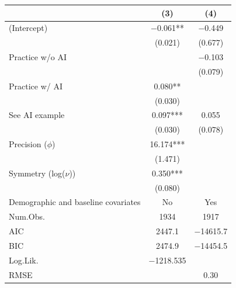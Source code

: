 \documentclass[11pt]{report}
\begin{document}
\begin{append}
\begin{table}[h]
    \begin{tabular}{lcc}
    \toprule
    & (3) & (4) \\ 
    \midrule 
(Intercept)                        & \num{-0.061}** & \num{-0.449} \\
                                   & (\num{0.021})  & (\num{0.677}) \\
Practice w/o AI                    &                & \num{-0.103} \\
                                   &                & (\num{0.079}) \\
Practice w/ AI                     & \num{0.080}**  &               \\
                                   & (\num{0.030})  &               \\
See AI example                     & \num{0.097}*** & \num{0.055} \\
                                   & (\num{0.030})  & (\num{0.078}) \\
\midrule 
Precision ($\phi$)                 & \num{16.174}*** &              \\
                                   & (\num{1.471})   &              \\
Symmetry (log($\nu$))              & \num{0.350}***  &              \\
                                   & (\num{0.080})   &              \\
Demographic and baseline covariates & No              & Yes          \\
\midrule 
Num.Obs.                           & \num{1934}      & \num{1917}   \\
AIC                                & \num{2447.1}    & \num{-14615.7}\\
BIC                                & \num{2474.9}    & \num{-14454.5}\\
Log.Lik.                           & \num{-1218.535} &              \\
RMSE                               &                 & \num{0.30}   \\
\bottomrule
    \end{tabular}
    \label{tab:beta5}
\end{table}



\end{append}

\begin{bibliof}

\end{bibliof}
\end{document}
